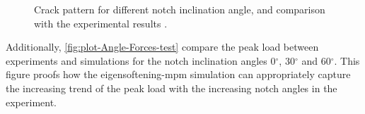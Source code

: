 \documentclass[preprint,12pt,a4paper]{elsarticle}
\begin{document}
\begin{figure}
\centering
{}
\caption{Crack pattern for different notch inclination angle, and
  comparison with the experimental results  \cite{LIM_1993}.}
\label{fig:Figure-Angle-Forces-test-damage-pattern}
\end{figure}
Additionally, \ref{fig:plot-Angle-Forces-test} compare the peak load
between experiments and simulations for the notch inclination angles
0$^{\circ}$, 30$^{\circ}$ and 60$^{\circ}$. This figure proofs how the
eigensoftening-\acrshort{mpm} simulation can appropriately capture the
increasing trend of the peak load with the increasing notch angles in
the experiment.
\end{document}
